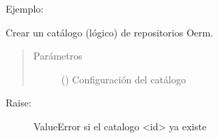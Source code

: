 \documentclass[a4paper,12pt,spanish]{sphinxmanual}
\begin{document}
\begin{fulllineitems}
\begin{fulllineitems}
\begin{quote}
\begin{description}
\begin{itemize}
\end{itemize}

\end{description}\end{quote}
\begin{description}
\item[{Ejemplo:}] \leavevmode
\begin{sphinxVerbatim}[commandchars=\\\{\}]
   
  
 
\end{sphinxVerbatim}

\end{description}

\end{fulllineitems}


\begin{fulllineitems}
\label{\detokenize{openerm.OermClient:openerm.OermClient.OermClient.catalog_create}}
Crear un catálogo (lógico) de repositorios Oerm.
\begin{quote}\begin{description}
\item[{Parámetros}] \leavevmode
{} () \textendash{} Configuración del catálogo

\end{description}\end{quote}
\begin{description}
\item[{Raise:}] \leavevmode
ValueError si el catalogo \textless{}id\textgreater{} ya existe


\end{description}
\end{fulllineitems}
\end{fulllineitems}
\end{document}
